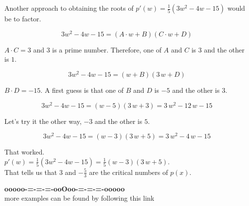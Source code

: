 \documentclass{ximera}
\begin{document}
Another approach to obtaining the roots of $p'(w) = \frac{1}{5}(3w^2 - 4w - 15)$ would be to factor. 


\[
3w^2 - 4w - 15      = (A \cdot w + B)(C \cdot w + D) 
\]

$A \cdot C = 3$ and $3$ is a prime number.  Therefore, one of $A$ and $C$ is $3$ and the other is $1$.



\[
3w^2 - 4w - 15      = (w + B)(3 \, w + D) 
\]



$B \cdot D = -15$.  A first guess is that one of $B$ and $D$ is $-5$ and the other is $3$. 


\[
3w^2 - 4w - 15      = (w - 5)(3 \, w + 3) = 3 \, w^2 -12 \, w - 15
\]



Let's try it the other way, $-3$ and the other is $5$.



\[
3w^2 - 4w - 15     = (w - 3)(3 \, w + 5) = 3 \, w^2  -4 \, w - 15
\]



That worked. \\



$p'(w) = \frac{1}{5}(3w^2 - 4w - 15) = \frac{1}{5} (w - 3)(3 \, w + 5)$. \\


That tells us that $3$ and $-\frac{5}{3}$ are the critical numbers of $p(x)$.






\begin{center}
\textbf{\textcolor{green!50!black}{ooooo-=-=-=-ooOoo-=-=-=-ooooo}} \\

more examples can be found by following this link\\ 

\end{center}
\end{document}
